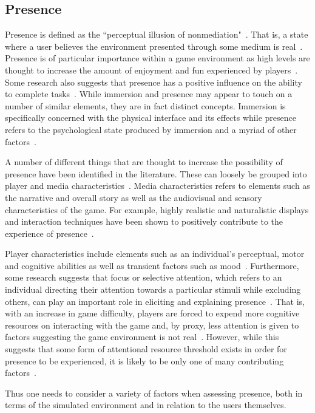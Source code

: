 \subsection{Presence}
Presence is defined as the ``perceptual illusion of nonmediation"~\citep{Rava04}. That is, a state where a user believes the environment presented through some medium is real~\citep{Ivor07}. Presence is of particular importance within a game environment as high levels are thought to increase the amount of enjoyment and fun experienced by players~\citep{Rava04}. Some research also suggests that presence has a positive influence on the ability to complete tasks~\citep{Ivor07}. While immersion and presence may appear to touch on a number of similar elements, they are in fact distinct concepts. Immersion is specifically concerned with the physical interface and its effects while presence refers to the psychological state produced by immersion and a myriad of other factors~\citep{Brow04}.

A number of different things that are thought to increase the possibility of presence have been identified in the literature. These can loosely be grouped into player and media characteristics~\citep{Less01}. Media characteristics refers to elements such as the narrative and overall story as well as the audiovisual and sensory characteristics of the game. For example, highly realistic and naturalistic displays and interaction techniques have been shown to positively contribute to the experience of presence~\citep{Less01}. 

Player characteristics include elements such as an individual's perceptual, motor and cognitive abilities as well as transient factors such as mood~\citep{Less01}. Furthermore, some research suggests that focus or selective attention, which refers to an individual directing their attention towards a particular stimuli while excluding others, can play an important role in eliciting and explaining presence~\citep{Witm98}. That is, with an increase in game difficulty, players are forced to expend more cognitive resources on interacting with the game and, by proxy, less attention is given to factors suggesting the game environment is not real~\citep{Rava04}. However, while this suggests that some form of attentional resource threshold exists in order for presence to be experienced, it is likely to be only one of many contributing factors~\citep{Witm98}.

Thus one needs to consider a variety of factors when assessing presence, both in terms of the simulated environment and in relation to the users themselves. 

